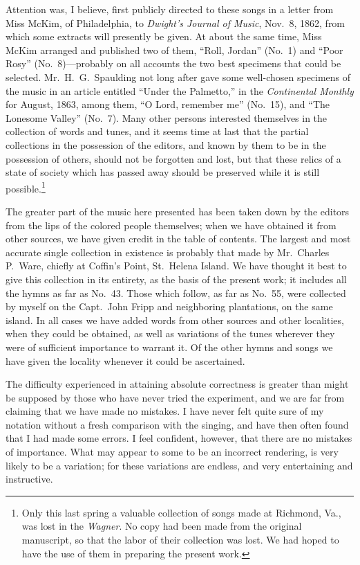 \documentclass[a5paper,10pt]{book}
\begin{document}
Attention was, I believe, first publicly directed to these songs in a
letter from Miss McKim, of Philadelphia, to \emph{Dwight's Journal of
Music}, Nov.~8, 1862, from which some extracts will presently be
given.  At about the same time, Miss McKim arranged and published two
of them, ``Roll, Jordan'' (No.~1) and ``Poor Rosy'' (No.~8)---probably
on all accounts the two best specimens that could be selected.
Mr.~H.~G.~Spaulding not long after gave some well-chosen specimens of
the music in an article entitled ``Under the Palmetto,'' in the
\emph{Continental Monthly} for August, 1863, among them, ``O Lord,
remember me'' (No.~15), and ``The Lonesome Valley'' (No.~7).  Many
other persons interested themselves in the collection of words and
tunes, and it seems time at last that the partial collections in the
possession of the editors, and known by them to be in the possession
of others, should not be forgotten and lost, but that these relics of
a state of society which has passed away should be preserved while it
is still possible.\footnote{Only this last spring a valuable
collection of songs made at Richmond, Va., was lost in the
\emph{Wagner}.  No copy had been made from the original manuscript, so
that the labor of their collection was lost.  We had hoped to have the
use of them in preparing the present work.}

The greater part of the music here presented has been taken down by
the editors from the lips of the colored people themselves; when we
have obtained it from other sources, we have given credit in the table
of contents.  The largest and most accurate single collection in
existence is probably that made by Mr.~Charles P.~Ware, chiefly at
Coffin's Point, St.~Helena Island.  We have thought it best to give
this collection in its entirety, as the basis of the present work; it
includes all the hymns as far as No.~43.  Those which follow, as far
as No.~55, were collected by myself on the Capt.~John Fripp and
neighboring plantations, on the same island.  In all cases we have
added words from other sources and other localities, when they could
be obtained, as well as variations of the tunes wherever they were of
sufficient importance to warrant it.  Of the other hymns and songs we
have given the locality whenever it could be ascertained.

The difficulty experienced in attaining absolute correctness is
greater than might be supposed by those who have never tried the
experiment, and we are far from claiming that we have made no
mistakes.  I have never felt quite sure of my notation without a fresh
comparison with the singing, and have then often found that I had made
some errors.  I feel confident, however, that there are no mistakes of
importance.  What may appear to some to be an incorrect rendering, is
very likely to be a variation; for these variations are endless, and
very entertaining and instructive.
\end{document}
